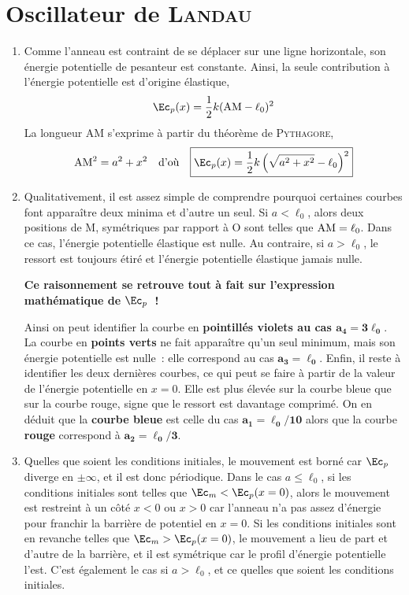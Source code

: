 \documentclass[a4paper, 12pt, final, garamond]{book}
\begin{document}
\section{Oscillateur de \textsc{Landau}}
\begin{enumerate}
    \item Comme l'anneau est contraint de se déplacer sur une ligne horizontale,
        son énergie potentielle de pesanteur est constante. Ainsi, la seule
        contribution à l'énergie potentielle est d'origine élastique,
        \[\Ec_p(x) = \frac{1}{2}k({\rm AM} -\ell_0)^2\]
        La longueur AM s'exprime à partir du théorème de \textsc{Pythagore},
        \[
            {\rm AM}^2 = a^2 + x^2
            \quad\text{d'où}\quad
            \boxed{\Ec_p(x) = \frac{1}{2}k\left(\sqrt{a^2+x^2} - \ell_0\right)^2}
        \]
    \item Qualitativement, il est assez simple de comprendre pourquoi certaines
        courbes font apparaître deux minima et d'autre un seul. Si $a < \ell_0$,
        alors deux positions de M, symétriques par rapport à O sont telles que
        ${\rm AM} = \ell_0$. Dans ce cas, l'énergie potentielle élastique est
        nulle. Au contraire, si $a > \ell_0$, le ressort est toujours étiré et
        l'énergie potentielle élastique jamais nulle.
        \begin{bexem}{}
            \bfseries Ce raisonnement se retrouve tout à fait sur l'expression
            mathématique de $\Ec_p$~!
        \end{bexem}
        Ainsi on peut identifier la courbe en \textbf{pointillés violets au cas
        $\mathbf{a_4 = 3\ell_0}$}. La courbe en \textbf{points verts} ne fait
        apparaître qu'un seul minimum, mais son énergie potentielle est nulle~:
        elle correspond au cas $\mathbf{a_3 = \ell_0}$. Enfin, il reste à
        identifier les deux dernières courbes, ce qui peut se faire à partir de
        la valeur de l'énergie potentielle en $x = 0$. Elle est plus élevée sur
        la courbe bleue que sur la courbe rouge, signe que le ressort est
        davantage comprimé. On en déduit que la \textbf{courbe bleue} est celle
        du cas $\mathbf{a_1 = \ell_0/10}$ alors que la courbe \textbf{rouge}
        correspond à $\mathbf{a_2 = \ell_0/3}$. \bigbreak

    \item Quelles que soient les conditions initiales, le mouvement est borné
        car $\Ec_p$ diverge en $\pm\infty$, et il est donc périodique. Dans le
        cas $a \leq \ell_0$, si les conditions initiales sont telles que $\Ec_m
        < \Ec_p (x = 0)$, alors le mouvement est restreint à un côté $x < 0$ ou
        $x > 0$ car l'anneau n'a pas assez d'énergie pour franchir la barrière
        de potentiel en $x = 0$. Si les conditions initiales sont en revanche
        telles que $\Ec_m > \Ec_p (x = 0)$, le mouvement a lieu de part et
        d'autre de la barrière, et il est symétrique car le profil d'énergie
        potentielle l'est. C'est également le cas si $a > \ell_0$, et ce quelles
        que soient les conditions initiales. \bigbreak


\end{enumerate}
\end{document}
